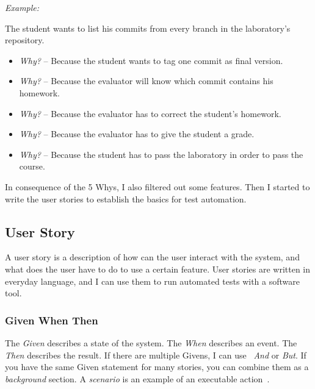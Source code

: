 \emph{Example:}

The student wants to list his commits from every branch in the laboratory's repository.
\begin{itemize}
	\item \emph{Why?} -- Because the student wants to tag one commit as final version.
	\item \emph{Why?} -- Because the evaluator will know which commit contains his homework.
	\item \emph{Why?} -- Because the evaluator has to correct the student's homework.
	\item \emph{Why?} -- Because the evaluator has to give the student a grade.
	\item \emph{Why?} -- Because the student has to pass the laboratory in order to pass the course.
\end{itemize}

In consequence of the 5 Whys, I also filtered out some features. Then I started to write the user stories to establish the basics for test automation.

\subsection{User Story}
A user story is a description of how can the user interact with the system, and what does the user have to do to use a certain feature. User stories are written in everyday language, and I can use them to run automated tests with a software tool. 

\subsubsection{Given When Then}



The \emph{Given} describes a state of the system. The \emph{When} describes an event. The \emph{Then} describes the result. If there are multiple Givens, I can use ~\emph{And} or \emph{But}. If you have the same Given statement for many stories, you can combine them as a \emph{background} section. A \emph{scenario} is an example of an executable action~\cite{Cucumber-scenario}. 


